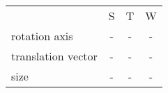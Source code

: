 \begin{center}
\begin{tabular}{l c c c} 
						& S & T & W \\
	rotation axis 		& - & - & -\\
	translation vector 	& - & - & -\\
	size 				& - & - & -\\
\end{tabular}
\end{center}
